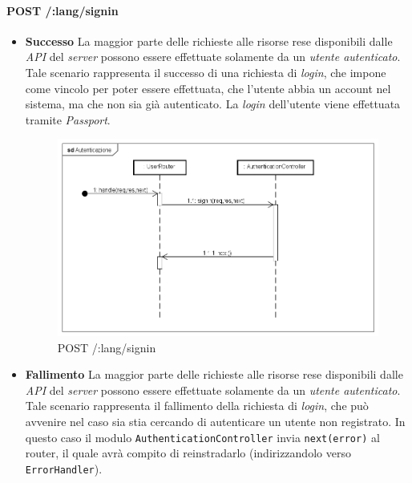 \paragraph{POST /:lang/signin}
\begin{itemize}
\item \textbf{Successo}
La maggior parte delle richieste alle risorse rese disponibili dalle \textit{API} del \textit{server} possono essere effettuate solamente da un \textit{utente autenticato}. Tale scenario rappresenta il successo di una richiesta di \textit{login}, che impone come vincolo per poter essere effettuata, che l'utente abbia un account nel sistema, ma che non sia già autenticato. La \textit{login} dell'utente viene effettuata tramite \textit{Passport}.

\label{Procedura di autenticazione}
\begin{figure}[ht]
	\centering
	\includegraphics[scale=0.40]{UML/DiagrammiDiSequenza/Back-end/POST__lang_signin_success.png}
	\caption{POST /:lang/signin}
\end{figure}
\FloatBarrier
 
\item \textbf{Fallimento}
La maggior parte delle richieste alle risorse rese disponibili dalle \textit{API} del \textit{server} possono essere effettuate solamente da un \textit{utente autenticato}. Tale scenario rappresenta il fallimento della richiesta di \textit{login}, che può avvenire nel caso sia stia cercando di autenticare un utente non registrato. In questo caso il modulo \texttt{AuthenticationController} invia \texttt{next(error)} al router, il quale avrà compito di reinstradarlo (indirizzandolo verso \texttt{ErrorHandler}).


\end{itemize}
